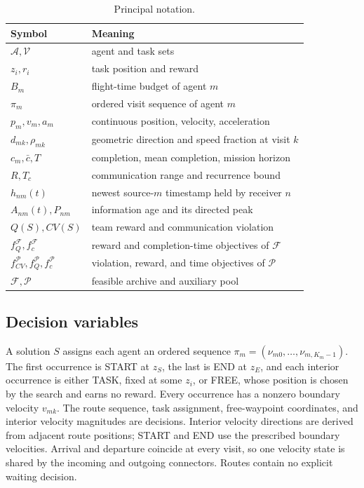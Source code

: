 \begin{table}[t]
\centering
\caption{Principal notation.}
\label{tab:notation}
\begin{tabular}{ll}
\toprule
Symbol & Meaning\\
\midrule
$\mathcal A,\mathcal V$ & agent and task sets\\
$z_i,r_i$ & task position and reward\\
$B_m$ & flight-time budget of agent $m$\\
$\pi_m$ & ordered visit sequence of agent $m$\\
$p_m,v_m,a_m$ & continuous position, velocity, acceleration\\
$d_{mk},\rho_{mk}$ & geometric direction and speed fraction at visit $k$\\
$c_m,\bar c,T$ & completion, mean completion, mission horizon\\
$R,T_c$ & communication range and recurrence bound\\
$h_{nm}(t)$ & newest source-$m$ timestamp held by receiver $n$\\
$A_{nm}(t),P_{nm}$ & information age and its directed peak\\
$Q(S),CV(S)$ & team reward and communication violation\\
$f_Q^{\mathcal F},f_c^{\mathcal F}$ & reward and completion-time objectives of $\mathcal F$\\
$f_{CV}^{\mathcal P},f_Q^{\mathcal P},f_c^{\mathcal P}$ & violation, reward, and time objectives of $\mathcal P$\\
$\mathcal F,\mathcal P$ & feasible archive and auxiliary pool\\
\bottomrule
\end{tabular}
\end{table}

\subsection{Decision variables}
A solution $S$ assigns each agent an ordered sequence $\pi_m=(\nu_{m0},\ldots,\nu_{m,K_m-1})$. The first occurrence is START at $z_S$, the last is END at $z_E$, and each interior occurrence is either TASK, fixed at some $z_i$, or FREE, whose position is chosen by the search and earns no reward. Every occurrence has a nonzero boundary velocity $v_{mk}$. The route sequence, task assignment, free-waypoint coordinates, and interior velocity magnitudes are decisions. Interior velocity directions are derived from adjacent route positions; START and END use the prescribed boundary velocities. Arrival and departure coincide at every visit, so one velocity state is shared by the incoming and outgoing connectors. Routes contain no explicit waiting decision.

